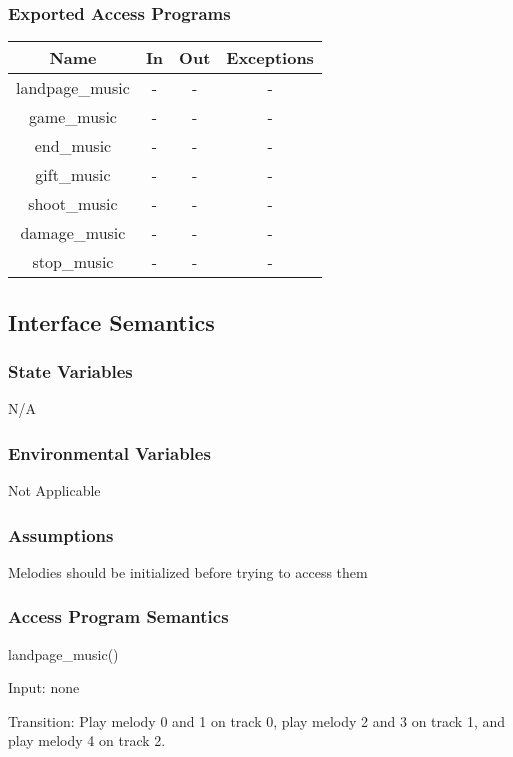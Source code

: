 \documentclass[12,english]{article}
\begin{document}
			\subsubsection{Exported Access Programs}
				\begin{tabular}[pos]{|c|c|c|c|}
					
					\hline
					\textbf{Name}& \textbf{In} & \textbf{Out} & \textbf{Exceptions} \\ \hline
					landpage\_music & - & - & -\\ \hline
					game\_music & - & - & -\\ \hline
					end\_music & - & - & -\\ \hline
					{\color{red}gift\_music} & {\color{red}-} & {\color{red}-} & {\color{red}-}\\ \hline
					shoot\_music & - & - & -\\ \hline
					damage\_music & - & - & -\\ \hline
					stop\_music & - & - & -\\ \hline
					
				\end{tabular}
				
		\subsection{Interface Semantics}
			\subsubsection{State Variables}
			N/A
			
			\subsubsection{Environmental Variables}
			Not Applicable
			
			\subsubsection{Assumptions}
			{\color{red}Melodies should be initialized before trying to access them}
			
			\subsubsection{Access Program Semantics}
			landpage\_music()
			
			Input: none
			
			Transition: Play melody 0 and 1 on track 0, play melody 2 and 3 on track 1, and play melody 4 on track 2.
			
\end{document}
